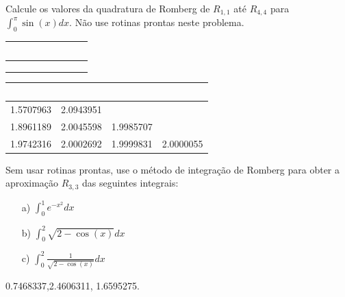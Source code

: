 \begin{exer}
 Calcule os valores da quadratura de Romberg de $R_{1,1}$ até $R_{4,4}$ para $\int_0^\pi \sin(x)dx$. Não use rotinas prontas neste problema.
\begin{center}
\begin{tabular}{|c|c|c|c|}
\hline
~\hspace{40pt}~ & ~\hspace{40pt}~& ~\hspace{40pt}~& ~\hspace{40pt}~\\
\hline
 & & &\\
\hline
&&&\\
\hline
&&&\\
\hline
\end{tabular}
\end{center}
\end{exer}
\begin{resp}
  
\begin{center}
\begin{tabular}{|c|c|c|c|}
\hline
~\hspace{40pt}~& ~\hspace{40pt}~& ~\hspace{40pt}~&\\
\hline
1.5707963  &  2.0943951 &&\\
\hline
1.8961189  &  2.0045598 &   1.9985707  &   \\
\hline
1.9742316  &  2.0002692 &   1.9999831 &   2.0000055  \\
\hline
\end{tabular}
\end{center}    
  
\end{resp}

\begin{exer}
Sem usar rotinas prontas, use o método de integração de Romberg para obter a aproximação $R_{3,3}$ das seguintes integrais:
\begin{itemize}
\item[a)] $\int_{0}^1 e^{-x^2}dx$
\item[b)] $\int_{0}^2 \sqrt{2-\cos(x)}dx$
\item[c)] $\int_{0}^2 \frac{1}{\sqrt{2-\cos(x)}}dx$
\end{itemize}
\end{exer}
\begin{resp}
  
0.7468337,2.4606311, 1.6595275.    
  
\end{resp}


